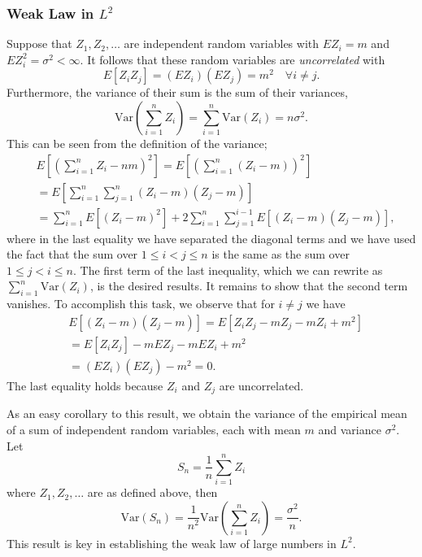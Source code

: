 \subsubsection{Weak Law in $L^2$}

Suppose that $Z_1, Z_2, \ldots$ are independent random variables with $E Z_i = m$ and $E Z_i^2 = \sigma^2 < \infty$.
It follows that these random variables are \emph{uncorrelated} with
\begin{equation*}
E [ Z_i Z_j ] = (E Z_i) (E Z_j) = m^2 \quad \forall i \neq j .
\end{equation*}
Furthermore, the variance of their sum is the sum of their variances,
\begin{equation*}
\mathrm{Var} \left( \sum_{i=1}^n Z_i \right)
= \sum_{i=1}^n \mathrm{Var} (Z_i)
= n \sigma^2 .
\end{equation*}
This can be seen from the definition of the variance;
\begin{equation*}
\begin{split}
&E \left[ \left( \sum_{i=1}^n Z_i - nm \right)^2 \right]
= E \left[ \left( \sum_{i=1}^n (Z_i - m) \right)^2 \right] \\
&= E \left[\sum_{i=1}^n \sum_{j=1}^n (Z_i - m) (Z_j - m) \right] \\
&= \sum_{i=1}^n E \left[ (Z_i - m)^2 \right]
+ 2 \sum_{i=1}^n \sum_{j=1}^{i-1} E [ (Z_i - m) (Z_j - m) ] ,
\end{split}
\end{equation*}
where in the last equality we have separated the diagonal terms and we have used the fact that the sum over $1 \leq i < j \leq n$ is the same as the sum over $1 \leq j < i \leq n$.
The first term of the last inequality, which we can rewrite as $\sum_{i=1}^n \mathrm{Var} (Z_i)$, is the desired results.
It remains to show that the second term vanishes.
To accomplish this task, we observe that for $i \neq j$ we have
\begin{equation*}
\begin{split}
&E [ (Z_i - m) (Z_j - m) ]
= E [ Z_i Z_j - m Z_j - m Z_i + m^2 ] \\
&= E [ Z_i Z_j ] - m E Z_j - m E Z_i + m^2 \\
&= (E Z_i) (E Z_j) - m^2
= 0 .
\end{split}
\end{equation*}
The last equality holds because $Z_i$ and $Z_j$ are uncorrelated.

As an easy corollary to this result, we obtain the variance of the empirical mean of a sum of independent random variables, each with mean $m$ and variance $\sigma^2$.
Let
\begin{equation*}
S_n = \frac{1}{n} \sum_{i=1}^n Z_i
\end{equation*}
where $Z_1, Z_2, \ldots$ are as defined above, then
\begin{equation*}
\mathrm{Var}(S_n) = \frac{1}{n^2} \mathrm{Var} \left( \sum_{i=1}^n Z_i \right)
= \frac{\sigma^2}{n} .
\end{equation*}
This result is key in establishing the weak law of large numbers in $L^2$.

